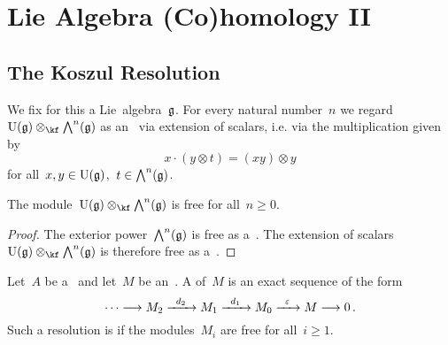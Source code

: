 \chapter{Lie Algebra (Co)homology II}
\label{lie algebra cohomology again}





\section{The Koszul Resolution}
\label{koszul resolution}

\begin{convention}
  We fix for this  a Lie~algebra~$\mathfrak{g}$.
  For every natural number~$n$ we regard~$\Univ(\glie) \otimes_{\kf} \Exterior^n(\glie)$ as an~\module{$\Univ(\glie)$} via extension of scalars, i.e. via the multiplication given by
  \[
    x \cdot (y \otimes t)
    =
    (xy) \otimes y
  \]
  for all~$x, y \in \operatorname{U}(\mathfrak{g})$,~$t \in \operatorname{\bigwedge}^n(\mathfrak{g})$.
\end{convention}


\begin{lemma}
  \label{extension of scalars is free}
  The module~$\Univ(\glie) \otimes_{\kf} \Exterior^n(\glie)$ is free for all~$n \geq 0$.
\end{lemma}


\begin{proof}
  The exterior power~$\operatorname{\bigwedge}^n(\mathfrak{g})$ is free as a~\module{$\kf$}.
  The extension of scalars~$\Univ(\glie) \otimes_{\kf} \Exterior^n(\glie)$ is therefore free as a~\module{$\Univ(\glie)$}.
\end{proof}


\begin{recall}
  Let~$A$ be a~\algebra{$\kf$} and let~$M$ be an~.
  A  of~$M$ is an exact sequence of the form
  \[
    \dotsb
    \to
    M_2
    \xto{d_2}
    M_1
    \xto{d_1}
    M_0
    \xto{\varepsilon}
    M
    \to
    0 \,.
  \]
  Such a resolution is  if the modules~$M_i$ are free for all~$i \geq 1$.
\end{recall}


